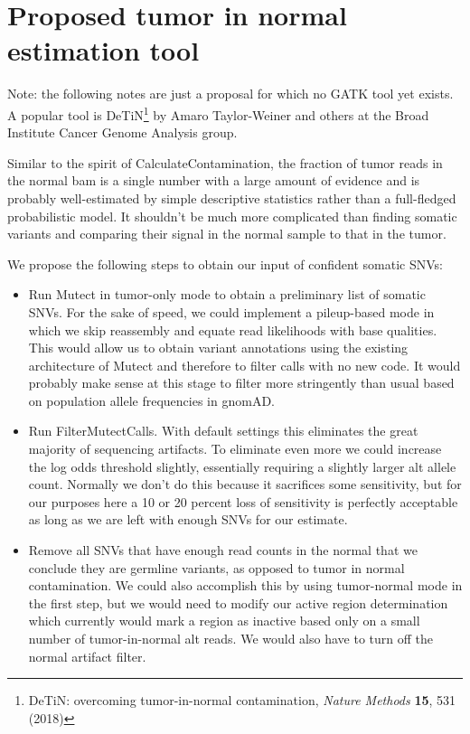 \documentclass[nofootinbib,amssymb,amsmath]{revtex4}
\begin{document}
\section{Proposed tumor in normal estimation tool}

Note: the following notes are just a proposal for which no GATK tool yet exists.  A popular tool is DeTiN\footnote{DeTiN: overcoming tumor-in-normal contamination, \textit{Nature Methods} \textbf{15}, 531 (2018)} by Amaro Taylor-Weiner and others at the Broad Institute Cancer Genome Analysis group.

Similar to the spirit of CalculateContamination, the fraction of tumor reads in the normal bam is a single number with a large amount of evidence and is probably well-estimated by simple descriptive statistics rather than a full-fledged probabilistic model.  It shouldn't be much more complicated than finding somatic variants and comparing their signal in the normal sample to that in the tumor.

We propose the following steps to obtain our input of confident somatic SNVs:
\begin{itemize}
\item Run Mutect in tumor-only mode to obtain a preliminary list of somatic SNVs.  For the sake of speed, we could implement a pileup-based mode in which we skip reassembly and equate read likelihoods with base qualities.  This would allow us to obtain variant annotations using the existing architecture of Mutect and therefore to filter calls with no new code.  It would probably make sense at this stage to filter more stringently than usual based on population allele frequencies in gnomAD.
\item Run FilterMutectCalls.  With default settings this eliminates the great majority of sequencing artifacts.  To eliminate even more we could increase the log odds threshold slightly, essentially requiring a slightly larger alt allele count.  Normally we don't do this because it sacrifices some sensitivity, but for our purposes here a 10 or 20 percent loss of sensitivity is perfectly acceptable as long as we are left with enough SNVs for our estimate.
\item Remove all SNVs that have enough read counts in the normal that we conclude they are germline variants, as opposed to tumor in normal contamination.  We could also accomplish this by using tumor-normal mode in the first step, but we would need to modify our active region determination which currently would mark a region as inactive based only on a small number of tumor-in-normal alt reads.  We would also have to turn off the normal artifact filter.
\end{itemize}
\end{document}
